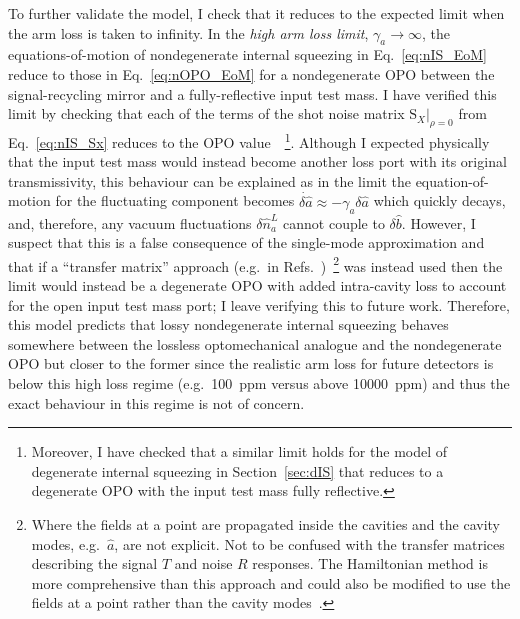 To further validate the model, I check that it reduces to the expected limit when the arm loss is taken to infinity. 
In the \emph{high arm loss limit}, $\gamma_a\rightarrow\infty$, the equations-of-motion of nondegenerate internal squeezing in Eq.~\ref{eq:nIS_EoM} reduce to those in Eq.~\ref{eq:nOPO_EoM} for a nondegenerate OPO between the signal-recycling mirror and a fully-reflective input test mass.
I have verified this limit by checking that each of the terms of the shot noise matrix $\text{S}_X|_{\rho=0}$ from Eq.~\ref{eq:nIS_Sx} reduces to the OPO value~\cite{schoriNarrowbandFrequencyTunable2002}~\footnote{Moreover, I have checked that a similar limit holds for the model of degenerate internal squeezing in Section~\ref{sec:dIS} that reduces to a degenerate OPO with the input test mass fully reflective.}.
Although I expected physically that the input test mass would instead become another loss port with its original transmissivity, this behaviour can be explained as in the limit the equation-of-motion for the fluctuating component becomes $\dot{\delta\hat a}\approx -\gamma_a \delta\hat a$ which quickly decays, and, therefore, any vacuum fluctuations $\delta\hat n^L_a$ cannot couple to $\delta\hat b$. However, I suspect that this is a false consequence of the single-mode approximation and that if a ``transfer matrix'' approach (e.g.\ in Refs.~\cite{korobkoQuantumExpanderGravitationalwave2019,finesse})~\footnote{Where the fields at a point are propagated inside the cavities and the cavity modes, e.g.\ $\hat a$, are not explicit. Not to be confused with the transfer matrices describing the signal $T$ and noise $R$ responses. The Hamiltonian method is more comprehensive than this approach and could also be modified to use the fields at a point rather than the cavity modes~\cite{danilishinQuantumMeasurementTheory2012}.} was instead used then the limit would instead be a degenerate OPO with added intra-cavity loss to account for the open input test mass port; I leave verifying this to future work.
Therefore, this model predicts that lossy nondegenerate internal squeezing behaves somewhere between the lossless optomechanical analogue and the nondegenerate OPO but closer to the former since the realistic arm loss for future detectors is below this high loss regime (e.g.\ 100~ppm versus above 10000~ppm) and thus the exact behaviour in this regime is not of concern. %

